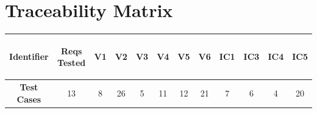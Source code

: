 \documentclass [10pt]{article}
\begin{document}
\section{Traceability Matrix}
\pagebreak
\begin{center}

\begin{tabularx} {.85\textwidth} {|c|c|c|c|c|c|c|c|c|c|c|c|} \hline
  \textbf{Identifier} & \begin{minipage} {.075\columnwidth} \vspace{1mm} \begin {center}\textbf{Reqs Tested}\vspace{1mm}\end{center}\end{minipage}
 & \textbf{V1} &\textbf{V2} &\textbf{V3} &\textbf{V4} &\textbf{V5} &\textbf{V6} &\textbf{IC1}  &\textbf{IC3} &\textbf{IC4}&\textbf{IC5}  \\ \hline
 
 
 \textbf{Test Cases}& 13 & 8  &26 &5 &11 &12 &21&7  &6 & 4 & 20 \\ \hline


\end{tabularx}
\end{center}
\end{document}
